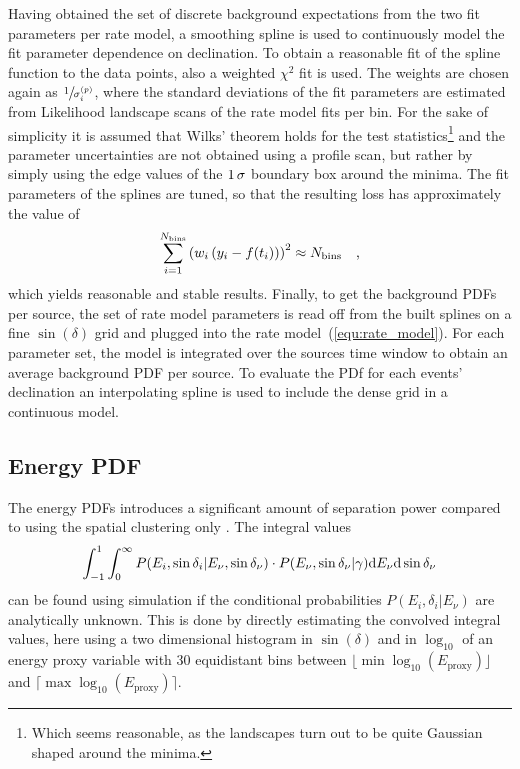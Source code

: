 Having obtained the set of discrete background expectations from the two fit parameters per rate model, a smoothing spline is used to continuously model the fit parameter dependence on declination.
To obtain a reasonable fit of the spline function to the data points, also a weighted $\chi^2$ fit is used.
The weights are chosen again as $\sfrac{1}{\sigma_i^{(p)}}$, where the standard deviations of the fit parameters are estimated from Likelihood landscape scans of the rate model fits per bin.
For the sake of simplicity it is assumed that Wilks' theorem holds for the test statistics\footnote{Which seems reasonable, as the landscapes turn out to be quite Gaussian shaped around the minima.} and the parameter uncertainties are not obtained using a profile scan, but rather by simply using the edge values of the $\num{1}\,\sigma$ boundary box around the minima.
The fit parameters of the splines are tuned, so that the resulting loss has approximately the value of
\begin{equation}
  \sum_{i=1}^{N_\text{bins}} \left(w_i\left(y_i - f(t_i)\right)\right)^2
  \approx N_\text{bins}
  \quad\text{,}
\end{equation}
which yields reasonable and stable results.
Finally, to get the background PDFs per source, the set of rate model parameters is read off from the built splines on a fine $\sin(\delta)$ grid and plugged into the rate model~(\ref{equ:rate_model}).
For each parameter set, the model is integrated over the sources time window to obtain an average background PDF per source.
To evaluate the PDf for each events' declination an interpolating spline is used to include the dense grid in a continuous model.

\subsection*{Energy PDF}
The energy PDFs introduces a significant amount of separation power compared to using the spatial clustering only \cite{Braun:2008bg}.
The integral values
\begin{equation}
  \int_{-1}^{1}\int_0^\infty
    P(E_i,\sin{\delta_i}|E_\nu, \sin{\delta_\nu})\cdot
    P(E_\nu, \sin{\delta_\nu}|\gamma) \mathrm{d}E_\nu\mathrm{d}\sin{\delta_\nu}
\end{equation}
can be found using simulation if the conditional probabilities $P(E_i,\delta_i|E_\nu)$ are analytically unknown.
This is done by directly estimating the convolved integral values, here using a two dimensional histogram in $\sin(\delta)$ and in $\log_{10}$ of an energy proxy variable with $\num{30}$ equidistant bins between $\lfloor \min\log_{10}(E_\text{proxy}) \rfloor$ and $\lceil \max\log_{10}(E_\text{proxy}) \rceil$.

